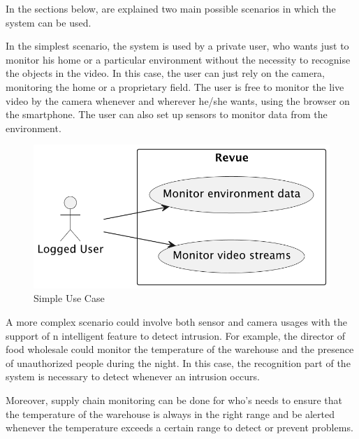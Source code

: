 \documentclass{scrartcl}
\begin{document}
    In the sections below, are explained two main possible scenarios in which the system can be used.

    In the simplest scenario, the system is used by a private user, who wants just to monitor his home or a particular
    environment without the necessity to recognise the objects in the video.
    In this case, the user can just rely on the camera, monitoring the home or a proprietary field.
    The user is free to monitor the live video by the camera whenever and wherever he/she wants, using the browser on the smartphone.
    The user can also set up sensors to monitor data from the environment.

    \begin{figure}
        \centering
        \includegraphics[scale=0.6]{img/simple-use-case}
        \caption{Simple Use Case}
        \label{fig:simple-use-case}
    \end{figure}

    A more complex scenario could involve both sensor and camera usages with the support of n intelligent feature to detect intrusion.
    For example, the director of food wholesale could monitor the temperature of the warehouse and the presence of unauthorized people during the night.
    In this case, the recognition part of the system is necessary to detect whenever an intrusion occurs.

    Moreover, supply chain monitoring can be done for who's needs to ensure that the temperature of
    the warehouse is always in the right range and be alerted whenever the temperature exceeds a certain range to detect or
    prevent problems.
\end{document}
